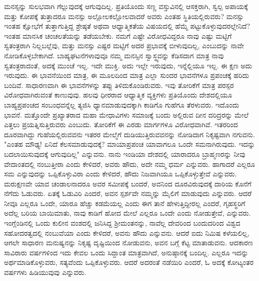 ಮನಸ್ಸನ್ನು ಸುಲಭವಾಗಿ ಗೆಲ್ಲುವುದಕ್ಕೆ ಆಗುವುದಿಲ್ಲ. ಪ್ರತಿಯೊಂದು ಸಣ್ಣ ವಸ್ತುವಿನಲ್ಲಿ ಆಸಕ್ತರಾಗಿ, ಸ್ವಲ್ಪ ಅಪಾಯಕ್ಕೆ ಮತ್ತು ಕೋಪಕ್ಕೆ ತುತ್ತಾದರೂ ಮನಸ್ಸು ಅಲ್ಲೋಲಕಲ್ಲೋಲವಾದರೆ ಅವರು ಎಂತಹ ಸ್ಥಿತಿಯಲ್ಲಿರುವರು? ಮನಸ್ಸು ಇಂತಹ ಕ್ಷೋಭೆಗೆ ತುತ್ತಾಗುತ್ತಿದ್ದ ಶ್ರೇಷ್ಠತೆ ಅಥವಾ ಆಧ್ಯಾತ್ಮಿಕತೆಯ ವಿಷಯದಲ್ಲಿ ಹೆಮ್ಮೆ ಪಟ್ಟುಕೊಳ್ಳುವುದರಲ್ಲೇನಿದೆ? ಇಂತಹ ಮಾನಸಿಕ ಚಂಚಲತೆಯನ್ನು ತಡೆಯಬೇಕು. ನಮಗೆ ಎಷ್ಟೇ ವಿರೋಧವಿದ್ದರೂ ನಾವು ಎಷ್ಟು ಮಟ್ಟಿಗೆ ಸ್ವತಂತ್ರರಾಗಿ ನಿಲ್ಲಬಲ್ಲೆವು, ಮತ್ತು ಮನಸ್ಸು ಎಷ್ಟರ ಮಟ್ಟಿಗೆ ಅದರ ಪ್ರಭಾವಕ್ಕೆ ಬೀಳುವುದಿಲ್ಲ, ಎಂಬುದನ್ನು ನಾವೇ ನೋಡಿಕೊಳ್ಳಬೇಕಾಗಿದೆ. ಬಾಹ್ಯಘಟನೆಗಳಾವುವೂ ನಮ್ಮ ಮನಸ್ಸಿನ ಸ್ವಾಸ್ಥ್ಯವನ್ನು ಕೆಡಿಸದಾಗ ಮಾತ್ರ ನಾವು ಸ್ವತಂತ್ರರಾದಂತೆ, ಅದಕ್ಕೆ ಮುಂಚೆ ಇಲ್ಲ. ಇದೇ ಮುಕ್ತಿ. ಅದು ಇಲ್ಲೇ ಇರುವುದು, ಇನ್ನೆಲ್ಲಿಯೂ ಇಲ್ಲ. ಈ ಕ್ಷಣ ಅದು ಇರುವುದು. ಈ ಭಾವನೆಯಿಂದ ಮಾತ್ರ, ಈ ಮೂಲದಿಂದ ಮಾತ್ರ ಎಲ್ಲಾ ಸುಂದರ ಭಾವನೆಗಳೂ ಪ್ರಪಂಚಕ್ಕೆ ಹರಿದು ಬಂದಿವೆ. ಸಾಧಾರಣವಾಗಿ ಈ ಭಾವನೆಗಳನ್ನು ತಪ್ಪು ತಿಳಿದುಕೊಂಡಿರುವರು. ಇವು ತೋರಿಕೆಗೆ ಮಾತ್ರ ಪರಸ್ಪರ ವಿರೋಧವಾಗಿರುವಂತೆ ಕಾಣುವುವು. ಹಲವು ಧೀರರಾದ ಆಧ್ಯಾತ್ಮಿಕ ವ್ಯಕ್ತಿಗಳು ಪ್ರತಿಯೊಂದು ದೇಶದಲ್ಲಿಯೂ ಬಾಹ್ಯಪ್ರಪಂಚದ ಸಂಬಂಧವನ್ನೆಲ್ಲ ತ್ಯಜಿಸಿ ಧ್ಯಾನಮಾಡುವುದಕ್ಕಾಗಿ ಕಾಡಿಗೊ ಗುಹೆಗೂ ತೆರಳುವರು. ಇದೊಂದು ಭಾವನೆ. ಮತ್ತೊಂದೇ ಪ್ರಖ್ಯಾತರಾದ ಮಹಾ ಮೇಧಾವಿಗಳು ಸಮಾಜಕ್ಕೆ ಬಂದು ಅಲ್ಲಿರುವ ದೀನ ದರಿದ್ರರನ್ನು ಮೇಲೆ ಎತ್ತಲು ಪ್ರಯತ್ನಿಸುತ್ತಿರುವರು ಎಂಬುದು. ತೋರಿಕೆಗೆ ಈ ಎರಡು ಮಾರ್ಗಗಳೂ ವಿರೋಧವಾಗಿವೆ. ಇತರರಿಂದ ದೂರವಾಗಿದ್ದು ಗುಹೆಯಲ್ಲಿರುವವನು ಇತರರ ಮೇಲ್ಮೆಗೆ ದುಡಿಯುತ್ತಿರುವವನನ್ನು ನೋಡಿದಾಗ ನಿಕೃಷ್ಟವಾಗಿ ನಗುವನು. "ಎಂತಹ ಮೌಢ್ಯ! ಏನಿದೆ ಕೆಲಸಮಾಡುವುದಕ್ಕೆ? ಮಾಯಾಪ್ರಪಂಚ ಯಾವಾಗಲೂ ಒಂದೇ ಸಮನಾಗಿರುವುದು. ಇದನ್ನು ಬದಲಾಯಿಸುವುದಕ್ಕೆ ಆಗುವುದಿಲ್ಲ" ಎನ್ನುವನು. ನಾನು ಇಂಡಿಯಾ ದೇಶದಲ್ಲಿ ಯಾರಾದರೂ ಬ್ರಾಹ್ಮಣರನ್ನು ನೀವು ವೇದಾಂತದಲ್ಲಿ ನಂಬುತ್ತೀರಾ ಎಂದು ಕೇಳಿದರೆ, ಅವರು ಹೌದು, ಅದೇ ನಮ್ಮ ಧರ್ಮ ಎನ್ನುವರು. ಹಾಗಾದರೆ ಎಲ್ಲರೂ ಸಮ ಎನ್ನುವುದನ್ನು ಒಪ್ಪಿಕೊಳ್ಳುವಿರಾ ಎಂದು ಕೇಳಿದರೆ, ಹೌದು ನಿಜವಾಗಿಯೂ ಒಪ್ಪಿಕೊಳ್ಳುತ್ತೇವೆ ಎನ್ನುವರು. ಮರುಕ್ಷಣವೇ ಯಾವ ಚಂಡಾಲನಾದರೂ ಅವರ ಸಮೀಪಕ್ಕೆ ಬಂದರೆ, ಅವನಿಂದ ದೂರವಿರುವುದಕ್ಕೆ ದಾರಿಯ ಕೊನೆಗೆ ನೆಗೆದು ಓಡುವರು. ಏತಕ್ಕೆ ಓಡುವಿರಿ ಎಂದರೆ, ಅವನ ಸ್ಪರ್ಶವೇ ನಮ್ಮನ್ನು ಮೈಲಿಗೆ ಮಾಡುವುದು ಎನ್ನುವರು. ಆದರೆ ನೀವೂ ಎಲ್ಲರೂ ಒಂದೇ, ಯಾರೂ ಹೆಚ್ಚು ಕಡಮೆಯಲ್ಲ ಎಂದು ಈಗ ತಾನೆ ಹೇಳುತ್ತಿದ್ದೀರಲ್ಲ ಎಂದರೆ, ಗೃಹಸ್ಥರಿಗೆ ಅದೆಲ್ಲ ಬರಿಯ ಬಾಯಿಮಾತು, ನಾವು ಕಾಡಿಗೆ ಹೋದ ಮೇಲೆ ಎಲ್ಲರೂ ಒಂದೇ ಎಂದು ನೋಡುತ್ತೇವೆ, ಎನ್ನುವರು. ಇಂಗ್ಲೆಂಡಿನಲ್ಲಿ ಒಂದು ಕುಲೀನ ವಂಶದಲ್ಲಿ ಜನಿಸಿದ್ದ ಶ‍್ರೀಮಂತನನ್ನು, ನಾವೆಲ್ಲ ದೇವರಿಂದ ಬಂದುದರಿಂದ ವಿಶ್ವದ ಸಹೋದರತ್ವದಲ್ಲಿ ನಂಬುವೆಯಾ ಎಂದು ಕೇಳಿದರೆ, ಅವನು ಹೌದು ಎನ್ನುವನು. ಆದರೆ ಐದು ನಿಮಿಷ ಕಳೆಯಲಿಲ್ಲ, ಆಗಲೇ ಸಾಧಾರಣ ಮನುಷ್ಯನನ್ನು ನಿಕೃಷ್ಟ ದೃಷ್ಟಿಯಿಂದ ನೋಡುವನು, ಅವನ ಬಗ್ಗೆ ಕೆಟ್ಟ ಮಾತಾಡುವನು. ಆದಕಾರಣ ಸಾವಿರಾರು ವರ್ಷಗಳಿಂದ ಇದು ಕೇವಲ ಒಂದು ಸಿದ್ದಾಂತ ಮಾತ್ರವಾಗಿದೆ, ಅನುಷ್ಠಾನಕ್ಕೆ ಬಂದಿಲ್ಲ. ಎಲ್ಲರೂ ಇದನ್ನು ಅರ್ಥಮಾಡಿಕೊಳ್ಳುವರು, ಸತ್ಯವೆಂದು ಒಪ್ಪಿಕೊಳ್ಳುವರು. ಆದರೆ ಅದರಂತೆ ನಡೆಯಿರಿ ಎಂದರೆ, ಓ ಅದಕ್ಕೆ ಕೋಟ್ಯಂತರ ವರ್ಷಗಳು ಹಿಡಿಯುವುವು ಎನ್ನುವರು.

